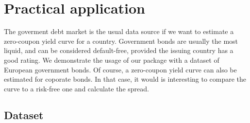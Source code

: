 \newpage
\section{Practical application}
\label{sec:pract-appl}

The goverment debt market is the usual data source if we want to estimate a zero-coupon yield curve for a country. Government bonds are usually the most liquid, and can be considered default-free, provided the issuing country has a good rating. We demonstrate the usage of our package with a dataset of European government bonds. Of course, a zero-coupon yield curve can also be estimated for coporate bonds. In that case, it would is interesting to compare the curve to a risk-free one and calculate the spread.

\subsection{Dataset}

%


